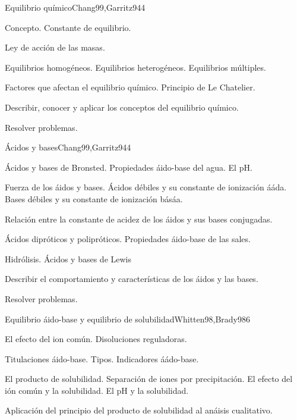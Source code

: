 \begin{syllabus}
\begin{unit}{Equilibrio químico}{Chang99,Garritz94}{4}
\begin{topics}
      \item Concepto. Constante de equilibrio.
      \item Ley de acción de las masas.
      \item Equilibrios homogéneos. Equilibrios heterogéneos. Equilibrios múltiples.
      \item Factores que afectan el equilibrio químico. Principio de Le Chatelier.
    \end{topics}
   \begin{unitgoals}
      \item Describir, conocer y aplicar los conceptos del equilibrio químico.
      \item Resolver problemas.
   \end{unitgoals}
\end{unit}

\begin{unit}{Ácidos y bases}{Chang99,Garritz94}{4}
\begin{topics}
	\item Ácidos y bases de Bronsted. Propiedades áido-base del agua. El pH.
	\item Fuerza de los áidos y bases. Ácidos débiles y su constante de ionización ááda. Bases débiles y su constante de ionización básáa. 
	\item Relación entre la constante de acidez de los áidos y sus bases conjugadas.
	\item Ácidos dipróticos y polipróticos. Propiedades áido-base de las sales.
	\item Hidrólisis.  Ácidos y bases de Lewis
\end{topics}

\begin{unitgoals}
	\item Describir el comportamiento y características de los áidos y las bases.
	\item Resolver problemas.
\end{unitgoals}
\end{unit}

\begin{unit}{Equilibrio áido-base y equilibrio de solubilidad}{Whitten98,Brady98}{6}
\begin{topics}
	\item El efecto del ion común. Disoluciones reguladoras.
	\item Titulaciones áido-base. Tipos.  Indicadores áádo-base.
	\item El producto de solubilidad. Separación de iones por precipitación. El efecto del ión común y la solubilidad. El pH y la solubilidad.
	\item Aplicación del principio del producto de solubilidad al anáisis cualitativo.
\end{topics}


\end{unit}
\end{syllabus}
